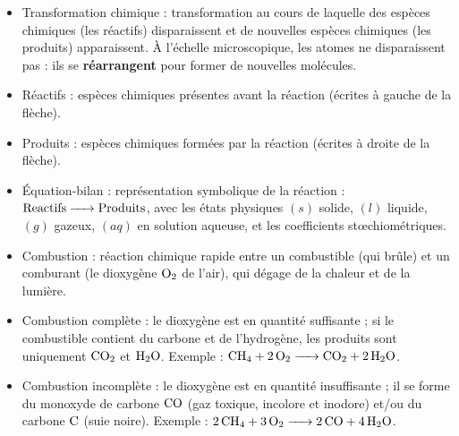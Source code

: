\documentclass[11pt]{article}
\newcommand{\cle}[1]{{\popxbold\color{popdark}#1}}
\newcounter{popsec}
\newcounter{popsub}
\newcommand{\courssub}[1]{%
  \stepcounter{popsub}%
  \par\vspace{9pt}\noindent{\popxbold\fontsize{11.5}{13}\selectfont\color{popink}{\color{poporange}\thepopsec.\thepopsub}\hspace{6pt}#1}\par\nopagebreak\vspace{4pt}
}
\begin{document}
\begin{bilan}

\courssub{Définitions clés}
\begin{itemize}
    \item \cle{Transformation chimique} : transformation au cours de laquelle des espèces chimiques (les réactifs) disparaissent et de nouvelles espèces chimiques (les produits) apparaissent. À l'échelle microscopique, les atomes ne disparaissent pas : ils se \textbf{réarrangent} pour former de nouvelles molécules.
    \item \cle{Réactifs} : espèces chimiques présentes avant la réaction (écrites à gauche de la flèche).
    \item \cle{Produits} : espèces chimiques formées par la réaction (écrites à droite de la flèche).
    \item \cle{Équation-bilan} : représentation symbolique de la réaction : $\ce{Reactifs -> Produits}$, avec les états physiques $(s)$ solide, $(l)$ liquide, $(g)$ gazeux, $(aq)$ en solution aqueuse, et les coefficients stœchiométriques.
    \item \cle{Combustion} : réaction chimique rapide entre un \cle{combustible} (qui brûle) et un \cle{comburant} (le dioxygène $\ce{O2}$ de l'air), qui dégage de la chaleur et de la lumière.
    \item \cle{Combustion complète} : le dioxygène est en quantité suffisante ; si le combustible contient du carbone et de l'hydrogène, les produits sont uniquement $\ce{CO2}$ et $\ce{H2O}$. Exemple : $\ce{CH4 + 2O2 -> CO2 + 2H2O}$.
    \item \cle{Combustion incomplète} : le dioxygène est en quantité insuffisante ; il se forme du \cle{monoxyde de carbone $\ce{CO}$} (gaz toxique, incolore et inodore) et/ou du carbone $\ce{C}$ (suie noire). Exemple : $\ce{2CH4 + 3O2 -> 2CO + 4H2O}$.
\end{itemize}


\end{bilan}
\end{document}
